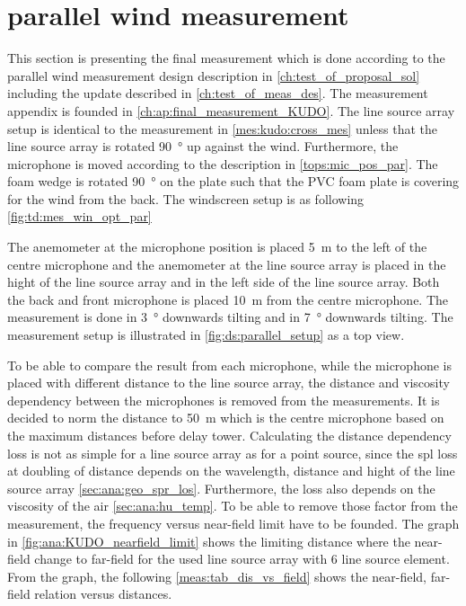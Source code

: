 \newpage
\section{parallel wind measurement}\label{mes:kudo:par_mes}
This section is presenting the final measurement which is done according to the parallel wind measurement design description in \autoref{ch:test_of_proposal_sol} including the update described in \autoref{ch:test_of_meas_des}. The measurement appendix is founded in \autoref{ch:ap:final_measurement_KUDO}. The line source array setup is identical to the measurement in \autoref{mes:kudo:cross_mes} unless that the line source array is rotated \SI{90}{\degree} up against the wind. Furthermore, the microphone is moved according to the description in \autoref{tops:mic_pos_par}. The foam wedge is rotated \SI{90}{\degree} on the plate such that the PVC foam plate is covering for the wind from the back. The windscreen setup is as following \autoref{fig:td:mes_win_opt_par}   



The anemometer at the microphone position is placed \SI{5}{\meter} to the left of the centre microphone and the anemometer at the line source array is placed in the hight of the line source array and in the left side of the line source array. Both the back and front microphone is placed \SI{10}{\meter} from the centre microphone. The measurement is done in \SI{3}{\degree} downwards tilting and in \SI{7}{\degree} downwards tilting. The measurement setup is illustrated in \autoref{fig:ds:parallel_setup} as a top view.



To be able to compare the result from each microphone, while the microphone is placed with different distance to the line source array, the distance and viscosity dependency between the microphones is removed from the measurements. It is decided to norm the distance to \SI{50}{\meter} which is the centre microphone based on the maximum distances before delay tower.
Calculating the distance dependency loss is not as simple for a line source array as for a point source, since the \gls{spl} loss at doubling of distance depends on the wavelength, distance and hight of the line source array \autoref{sec:ana:geo_spr_los}. Furthermore, the loss also depends on the viscosity of the air \autoref{sec:ana:hu_temp}. To be able to remove those factor from the measurement, the frequency versus near-field limit have to be founded. The graph in \autoref{fig:ana:KUDO_nearfield_limit} shows the limiting distance where the near-field change to far-field for the used line source array with 6 line source element. From the graph, the following \autoref{meas:tab_dis_vs_field} shows the near-field, far-field relation versus distances. 

